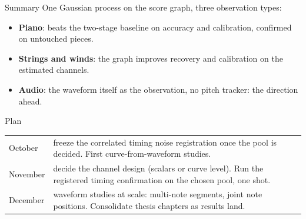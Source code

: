 \documentclass[aspectratio=169,11pt]{beamer}
\begin{document}




\begin{frame}{Summary}
  One Gaussian process on the score graph, three observation types:
  \begin{itemize}
    \item \textbf{Piano}: beats the two-stage baseline on accuracy and
          calibration, confirmed on untouched pieces.
    \item \textbf{Strings and winds}: the graph improves recovery and
          calibration on the estimated channels.
    \item \textbf{Audio}: the waveform itself as the observation, no
          pitch tracker: the direction ahead.
  \end{itemize}
\end{frame}

\begin{frame}{Plan}
  \begin{center}
  \small
  \begin{tabular}{@{}lp{96mm}@{}}
    \toprule
    October & freeze the correlated timing noise registration once the
          pool is decided. First curve-from-waveform studies. \\
    November & decide the channel design (scalars or curve level). Run
          the registered timing confirmation on the chosen pool, one
          shot. \\
    December & waveform studies at scale: multi-note segments, joint
          note positions. Consolidate thesis chapters as results land. \\
    \bottomrule
  \end{tabular}
  \end{center}
\end{frame}
\end{document}
